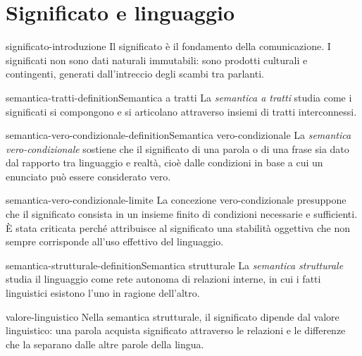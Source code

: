 \documentclass[preview]{standalone}
\begin{document}
\genpage

\section{Significato e linguaggio}

\begin{snippet}{significato-introduzione}
    Il significato è il fondamento della comunicazione. I significati non sono
    dati naturali immutabili: sono prodotti culturali e contingenti, generati
    dall'intreccio degli scambi tra parlanti.
\end{snippet}

\begin{snippetdefinition}{semantica-tratti-definition}{Semantica a tratti}
    La \emph{semantica a tratti} studia come i significati si compongono e si
    articolano attraverso insiemi di tratti interconnessi.
\end{snippetdefinition}

\begin{snippetdefinition}{semantica-vero-condizionale-definition}{Semantica vero-condizionale}
    La \emph{semantica vero-condizionale} sostiene che il significato di una
    parola o di una frase sia dato dal rapporto tra linguaggio e realtà, cioè
    dalle condizioni in base a cui un enunciato può essere considerato vero.
\end{snippetdefinition}

\begin{snippet}{semantica-vero-condizionale-limite}
    La concezione vero-condizionale presuppone che il significato consista in un
    insieme finito di condizioni necessarie e sufficienti. È stata criticata
    perché attribuisce al significato una stabilità oggettiva che non sempre
    corrisponde all'uso effettivo del linguaggio.
\end{snippet}

\begin{snippetdefinition}{semantica-strutturale-definition}{Semantica strutturale}
    La \emph{semantica strutturale} studia il linguaggio come rete autonoma di
    relazioni interne, in cui i fatti linguistici esistono l'uno in ragione
    dell'altro.
\end{snippetdefinition}

\begin{snippet}{valore-linguistico}
    Nella semantica strutturale, il significato dipende dal valore linguistico:
    una parola acquista significato attraverso le relazioni e le differenze che
    la separano dalle altre parole della lingua.
\end{snippet}
\end{document}
